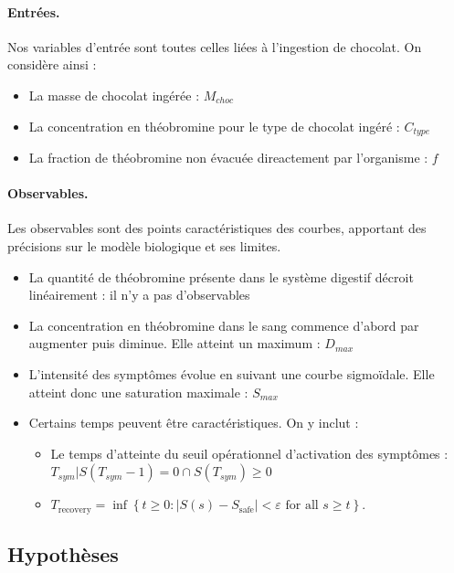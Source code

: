\documentclass[11pt,a4paper]{article}
\begin{document}
\paragraph{Entrées.}
Nos variables d'entrée sont toutes celles liées à l'ingestion de chocolat. On considère ainsi : 
\begin{itemize}
        \item {La masse de chocolat ingérée : \(M{_{choc}}\)}
        \item {La concentration en théobromine pour le type de chocolat ingéré : \(C{_{type}}\)}
        \item {La fraction de théobromine non évacuée direactement par l'organisme : \(f\)}
\end{itemize}

\paragraph{Observables.}
Les observables sont des points caractéristiques des courbes, apportant des précisions
sur le modèle biologique et ses limites. \\
\begin{itemize}
    \item {La quantité de théobromine présente dans le système digestif décroit linéairement :
    il n'y a pas d'observables}
    \item {La concentration en théobromine dans le sang commence d'abord par augmenter
    puis diminue. Elle atteint un maximum : \(D{_{max}}\)}
    \item {L'intensité des symptômes évolue en suivant une courbe sigmoïdale. Elle atteint
    donc une saturation maximale : \(S{_{max}}\)}
    \item {Certains temps peuvent être caractéristiques. On y inclut : 
    \begin{itemize}
        \item {Le temps d'atteinte du seuil opérationnel d'activation des symptômes : 
        \(T{_{sym}}|S(T{_{sym}}-1)=0 \cap S(T{_{sym}})\ge 0\)}
        \item {$
        T_{\mathrm{recovery}}
        =
        \inf
        \left\{
        t\geq 0:
        |S(s)-S_{\mathrm{safe}}|<\varepsilon
        \text{ for all }s\geq t
        \right\}.
        $}
    \end{itemize}}
\end{itemize}

\subsection{Hypothèses}
\end{document}
